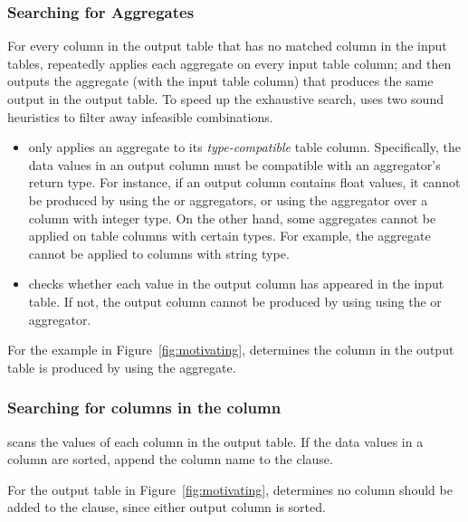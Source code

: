 
\subsubsection{Searching for Aggregates}
\label{sec:agg_search}

For every column in the output table that has no matched
column in the input tables,
\ourtool repeatedly applies each aggregate on
every input table column; and then outputs the aggregate (with the
input table column) that produces the same output 
in the output table. To speed up the exhaustive search,
\ourtool uses two sound heuristics to filter away infeasible
combinations.


\begin{itemize}
\item \ourtool only applies an aggregate
to its \textit{type-compatible} table column. Specifically,
the data values in an output column must be compatible with an
aggregator's return type. For instance, if an output column
contains float values, it cannot be produced by using the 
or  aggregators, or 
using the  aggregator over a column with integer type.
On the other hand, some aggregates cannot be applied on
table columns with certain types. For example, the 
aggregate cannot be applied to columns with string type.

\item \ourtool checks whether each value in the output
column has appeared in the input table. If not, the
output column cannot be produced by using
using the  or  aggregator.
\end{itemize}

For the example in Figure~\ref{fig:motivating}, \ourtool
determines the  column in the output
table is produced by using the  aggregate.



\subsubsection{Searching for columns in the  column}
\label{sec:orderby}
\ourtool scans the values of each column in the output table. If
the data values in a column are sorted, \ourtool
append the column name to the  clause.

For the output table in Figure~\ref{fig:motivating}, \ourtool
determines no column should be added to the  clause,
since either output column is sorted.

